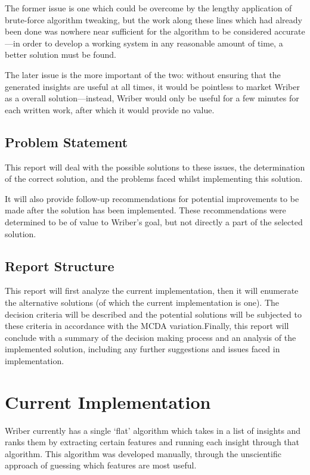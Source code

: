 \documentclass[12pt]{article}
\begin{document}
The former issue is one which could be overcome by the lengthy application of brute-force algorithm tweaking, but the work along these lines which had already been done was nowhere near sufficient for the algorithm to be considered accurate---in order to develop a working system in any reasonable amount of time, a better solution must be found.

The later issue is the more important of the two: without ensuring that the generated insights are useful at all times, it would be pointless to market Wriber as a overall solution---instead, Wriber would only be useful for a few minutes for each written work, after which it would provide no value.

\subsection{Problem Statement}
This report will deal with the possible solutions to these issues, the determination of the correct solution, and the problems faced whilst implementing this solution.

It will also provide follow-up recommendations for potential improvements to be made after the solution has been implemented. These recommendations were determined to be of value to Wriber's goal, but not directly a part of the selected solution.

\subsection{Report Structure}
This report will first analyze the current implementation, then it will enumerate the alternative solutions (of which the current implementation is one). The decision criteria will be described and the potential solutions will be subjected to these criteria in accordance with the MCDA variation.\@ Finally, this report will conclude with a summary of the decision making process and an analysis of the implemented solution, including any further suggestions and issues faced in implementation.
\newpage


\section{Current Implementation}
Wriber currently has a single `flat' algorithm which takes in a list of insights and ranks them by extracting certain features and running each insight through that algorithm. This algorithm was developed manually, through the unscientific approach of guessing which features are most useful.
\end{document}
